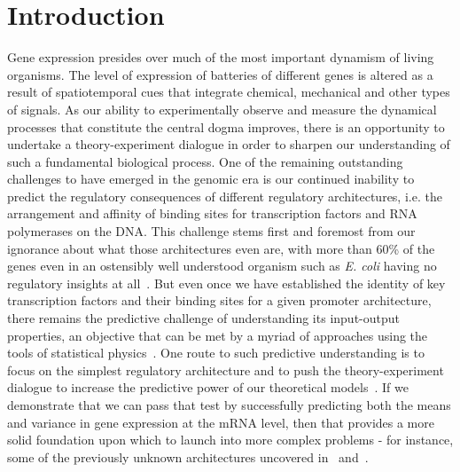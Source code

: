 \section{Introduction}

Gene expression presides over much of the most important dynamism of living
organisms. The level of expression of batteries of different genes is altered as
a result of spatiotemporal cues that integrate chemical, mechanical and other
types of signals. As our ability to experimentally observe and measure the
dynamical processes that constitute the central dogma improves, there is an
opportunity to undertake a theory-experiment dialogue in order to sharpen our
understanding of such a fundamental biological process. One of the remaining
outstanding challenges to have emerged in the genomic era is our continued
inability to predict the regulatory consequences of different regulatory
architectures, i.e. the arrangement and affinity of binding sites for
transcription factors and RNA polymerases on the DNA. This challenge stems first
and foremost from our ignorance about what those architectures even are, with
more than 60\% of the genes even in an ostensibly well understood organism such
as {\it E. coli} having no regulatory insights at all~\cite{Rydenfelt2014-2,
Belliveau2018, Ghatak2019, Santos_Zavaleta2019}. But even once we have
established the identity of key transcription factors and their binding sites
for a given promoter architecture, there remains the predictive challenge of
understanding its input-output properties, an objective that can be met by a
myriad of approaches using the tools of statistical physics~\cite{Ackers1982,
Shea1985, Buchler2003, Vilar2003a, Vilar2003b, Bintu2005a, Bintu2005c,
Kuhlman2007, Gertz2009, Sherman2012, Saiz2013, Ko1991, Peccoud1995, Record1996,
Kepler2001, Sanchez2008, Shahrezaei2008, Sanchez2011, Michel2010,
Iyer-Biswas2009}. One route to such predictive understanding is to focus on the
simplest regulatory architecture and to push the theory-experiment dialogue to
increase the predictive power of our theoretical models~\cite{Garcia2011,
Phillips2019}. If we demonstrate that we can pass that test by successfully
predicting both the means and variance in gene expression at the mRNA level,
then that provides a more solid foundation upon which to launch into more
complex problems - for instance, some of the previously unknown architectures
uncovered in~\cite{Belliveau2018} and~\cite{Ireland2020}.

